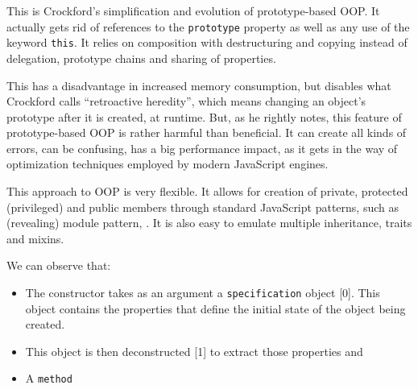 This is Crockford's simplification and evolution of prototype-based OOP. It actually gets rid of references to the \texttt{prototype} property as well as any use of the keyword \texttt{this}. It relies on composition with destructuring and copying instead of delegation, prototype chains and sharing of properties.

This has a disadvantage in increased memory consumption, but disables what Crockford calls ``retroactive heredity'', which means changing an object's prototype after it is created, at runtime. But, as he rightly notes, this feature of prototype-based OOP is rather harmful than beneficial. It can create all kinds of errors, can be confusing, has a big performance impact, as it gets in the way of optimization techniques employed by modern JavaScript engines\cite{mdn_set_prototype_of, v8_design}.

This approach to OOP is very flexible. It allows for creation of private, protected (privileged) and public members through standard JavaScript patterns, such as (revealing) module pattern\cite[Chapter~JavaScript Design Patterns, Section~The Revealing Module Pattern]{js_design_patterns}, \cite{crockford_private}. It is also easy to emulate multiple inheritance, traits and mixins.

We can observe that:
\begin{itemize}
    \item The constructor takes as an argument a \texttt{specification} object [0]. This object contains the properties that define the initial state of the object being created.
    \item This object is then deconstructed [1] to extract those properties and 
    \item A \texttt{method} 
\end{itemize}



